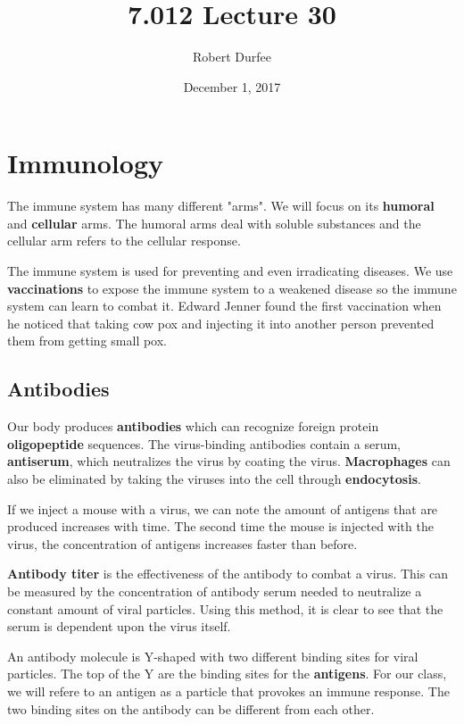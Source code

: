 \documentclass{article}
\title{ 7.012 Lecture 30 }
\author{ Robert Durfee }
\date{ December 1, 2017 }
\begin{document}
\maketitle

\section{ Immunology }

The immune system has many different "arms". We will focus on its
\textbf{humoral} and \textbf{cellular} arms. The humoral arms deal with soluble
substances and the cellular arm refers to the cellular response. 

The immune system is used for preventing and even irradicating diseases. We use
\textbf{vaccinations} to expose the immune system to a weakened disease so the
immune system can learn to combat it. Edward Jenner found the first vaccination
when he noticed that taking cow pox and injecting it into another person
prevented them from getting small pox.

\subsection{ Antibodies }

Our body produces \textbf{antibodies} which can recognize foreign protein
\textbf{oligopeptide} sequences. The virus-binding antibodies contain a serum,
\textbf{antiserum}, which neutralizes the virus by coating the virus.
\textbf{Macrophages} can also be eliminated by taking the viruses into the cell
through \textbf{endocytosis}. 

If we inject a mouse with a virus, we can note the amount of antigens that are
produced increases with time. The second time the mouse is injected with the
virus, the concentration of antigens increases faster than before.

\textbf{Antibody titer} is the effectiveness of the antibody to combat a virus.
This can be measured by the concentration of antibody serum needed to neutralize
a constant amount of viral particles. Using this method, it is clear to see that
the serum is dependent upon the virus itself. 

An antibody molecule is Y-shaped with two different binding sites for viral
particles. The top of the Y are the binding sites for the \textbf{antigens}. For
our class, we will refere to an antigen as a particle that provokes an immune
response. The two binding sites on the antibody can be different from each
other. 
\end{document}
